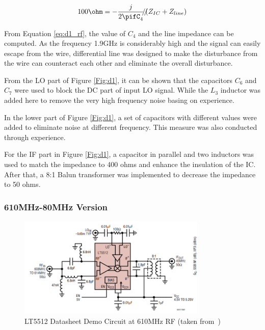 \documentclass[12pt, a4paper]{report}
\begin{document}
\begin{equation}
100\ohm=-\frac{j}{2\pifC_{4}} /\kern -0.8em / (Z_{IC}+Z_{line})
\label{eq:d1_rf}
\end{equation}

From Equation \ref{eq:d1_rf}, the value of $C_{4}$ and the line impedance can be computed. As the frequency 1.9GHz is considerably high and the signal can easily escape from the wire, differential line was designed to make the disturbance from the wire can counteract each other and eliminate the overall disturbance.

From the LO part of Figure \ref{Fig:d1}, it can be shown that the capacitors $C_{6}$ and $C_{7}$ were used to block the DC part of input LO signal. While the $L_{3}$ inductor was added here to remove the very high frequency noise basing on experience.

In the lower part of Figure \ref{Fig:d1}, a set of capacitors with different values were added to eliminate noise at different frequency. This measure was also conducted through experience. 

For the IF part in Figure \ref{Fig:d1}, a capacitor in parallel and two inductors was used to match the impedance to 400 ohms and enhance the insulation of the IC. After that, a 8:1 Balun transformer was implemented to decrease the impedance to 50 ohms.


\subsubsection{610MHz-80MHz Version}

\begin{figure}[htbp]     \begin{centering}
    \includegraphics[width=0.8\textwidth]{img/d0.png}
    \caption{\label{Fig:d0}LT5512 Datasheet Demo Circuit at 610MHz RF (taken from~\cite{ref:LT5512})}
    \end{centering}
    
\end{figure}
\end{document}
